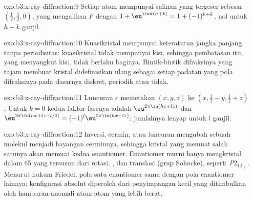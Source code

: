 \begin{solution}{exo:b3:x-ray-diffraction:9}
Setiap atom mempunyai salinan yang tergeser sebesar $(\frac12,\frac12,0)$, yang
mengalikan $F$ dengan $1 +
\eu^{\iu\pi(h+k)} = 1 + (-1)^{h+k}$, nol untuk $h + k$ ganjil.
\end{solution}

\begin{solution}{exo:b3:x-ray-diffraction:10}
Kuasikristal mempunyai keteraturan jangka panjang tanpa periodisitas: kuasikristal
tidak mempunyai kisi, sehingga pembatasan itu, yang menyangkut kisi, tidak
berlaku baginya. Bintik-bintik difraksinya yang tajam membuat kristal
didefinisikan ulang sebagai setiap padatan yang pola difraksinya pada dasarnya
diskret, periodik atau tidak.
\end{solution}

\begin{solution}{exo:b3:x-ray-diffraction:11}
Luncuran $c$ memetakan $(x, y, z)$ ke $(x, \frac12 - y, \frac12 + z)$. Untuk $k = 0$
kedua faktor fasenya adalah $\eu^{2\pi\iu(hx + lz)}$ dan $\eu^{2\pi\iu(hx + lz + l/2)} = (-1)^l
\eu^{2\pi\iu(hx+lz)}$: jumlahnya lenyap untuk $l$ ganjil.
\end{solution}

\begin{solution}{exo:b3:x-ray-diffraction:12}
Inversi, cermin, atau luncuran mengubah sebuah molekul menjadi bayangan
cerminnya, sehingga kristal yang memuat salah satunya akan memuat kedua
enantiomer. Enantiomer murni hanya mengkristal dalam 65  yang
tersusun dari rotasi, , dan translasi (grup Sohncke), seperti
\textit{P}$2_12_12_1$. Menurut hukum Friedel, pola satu enantiomer sama
dengan pola enantiomer lainnya; konfigurasi absolut diperoleh dari
penyimpangan kecil yang ditimbulkan oleh hamburan anomali atom-atom yang
lebih berat.
\end{solution}

